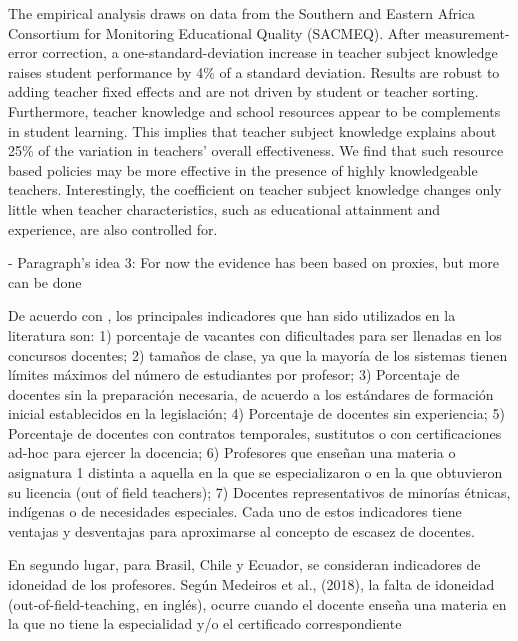 The empirical analysis draws on data from the Southern and Eastern Africa Consortium
for Monitoring Educational Quality (SACMEQ). After measurement-error correction, a one-standard-deviation increase in teacher subject knowledge raises student performance by 4\% of a standard deviation. Results are robust to adding teacher fixed effects and are not driven by student or teacher sorting. Furthermore, teacher knowledge and school resources appear to be complements in student learning. This implies that teacher subject knowledge explains about 25\% of the variation in teachers’ overall effectiveness. We find that such resource based policies may be more effective in the presence of highly knowledgeable teachers. Interestingly, the coefficient on teacher subject knowledge changes only
little when teacher characteristics, such as educational attainment and experience, are
also controlled for. \citep{Bietenbeck_et_al_2018}





- Paragraph's idea 3: For now the evidence has been based on proxies, but more can be done

De acuerdo con \citep{Sutcher_et_al_2016}, los principales indicadores que han sido utilizados en la literatura son: 1) porcentaje de vacantes con dificultades para ser llenadas en los concursos docentes; 2) tamaños de clase, ya que la mayoría de los sistemas tienen límites máximos del número de estudiantes por profesor; 3) Porcentaje de docentes sin la preparación necesaria, de acuerdo a los estándares de formación inicial establecidos en la legislación; 4) Porcentaje de docentes sin experiencia; 5) Porcentaje de docentes con contratos temporales, sustitutos o con certificaciones ad-hoc para ejercer la docencia; 6) Profesores que enseñan una materia o asignatura 1 distinta a aquella en la que se especializaron o en la que obtuvieron su licencia (out of field teachers); 7) Docentes representativos de minorías étnicas, indígenas o de necesidades especiales. Cada uno de estos indicadores tiene ventajas y desventajas para aproximarse al concepto de escasez de docentes.

\citep{Bertoni_et_al_2020a}
En segundo lugar, para Brasil, Chile y Ecuador, se consideran indicadores de idoneidad de los profesores. Según Medeiros et al., (2018), la falta de idoneidad (out-of-field-teaching, en inglés), ocurre cuando el docente enseña una materia en la que no tiene la especialidad y/o el certificado correspondiente

